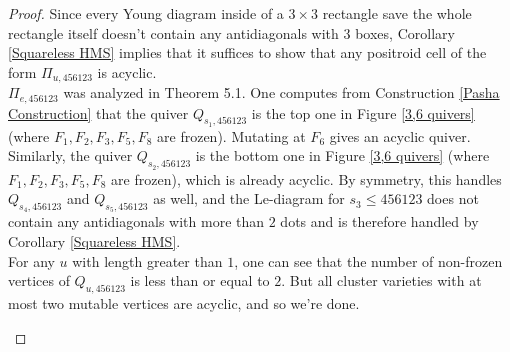 \documentclass[11pt]{amsart}
\theoremstyle{definition}
\theoremstyle{remark}
\numberwithin{equation}{section}
\begin{document}
\begin{proof}
    Since every Young diagram inside of a $3 \times 3$ rectangle save the whole rectangle itself doesn't contain any antidiagonals with $3$ boxes, Corollary \ref{Squareless HMS} implies that it suffices to show that any positroid cell of the form $\Pi_{u, 456123}$ is acyclic.\\
    
    $\Pi_{e, 456123}$ was analyzed in Theorem 5.1. One computes from Construction \ref{Pasha Construction} that the quiver $Q_{s_1, 456123}$ is the top one in Figure \ref{3,6 quivers} (where $F_1, F_2, F_3, F_5, F_8$ are frozen). Mutating at $F_6$ gives an acyclic quiver. Similarly, the quiver $Q_{s_2, 456123}$ is the bottom one in Figure \ref{3,6 quivers} (where $F_1, F_2, F_3, F_5, F_8$ are frozen), which is already acyclic. By symmetry, this handles $Q_{s_4, 456123}$ and $Q_{s_5, 456123}$ as well, and the Le-diagram for $s_3 \leq 456123$ does not contain any antidiagonals with more than $2$ dots and is therefore handled by Corollary \ref{Squareless HMS}.\\

    For any $u$ with length greater than $1$, one can see that the number of non-frozen vertices of $Q_{u, 456123}$ is less than or equal to $2$. But all cluster varieties with at most two mutable vertices are acyclic, and so we're done.

    \begin{figure}
\def\scl{1.3}
\def\Fscl{0.9}
\def\Fsep{4pt}
\def\arrlen{0.5}
\end{figure}
\end{proof}
\end{document}
